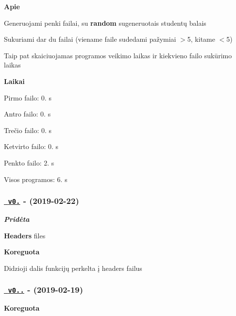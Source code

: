 {\bfseries{Apie}}


\begin{DoxyItemize}
\item Generuojami penki failai, su {\bfseries{random}} sugeneruotais studentų balais
\item Sukuriami dar du failai (viename faile sudedami pažymiai $>$5, kitame $<$5)
\item Taip pat skaiciuojamas programos veikimo laikas ir kiekvieno failo sukūrimo laikas
\end{DoxyItemize}

{\bfseries{Laikai}}


\begin{DoxyItemize}
\item Pirmo failo\+: 0. s
\item Antro failo\+: 0. s
\item Trečio failo\+: 0. s
\item Ketvirto failo\+: 0. s
\item Penkto failo\+: 2. s
\item Visos programos\+: 6. s
\end{DoxyItemize}

\subsubsection*{\href{https://github.com/ToNyHasK/VUObjektinisNO2/releases/tag/v0.3}{\texttt{ v0.}} -\/ (2019-\/02-\/22)}

{\itshape {\bfseries{Pridėta}}}


\begin{DoxyItemize}
\item {\bfseries{Headers}} files
\end{DoxyItemize}

{\bfseries{Koreguota}}


\begin{DoxyItemize}
\item Didzioji dalis funkcijų perkelta į headers failus
\end{DoxyItemize}

\subsubsection*{\href{https://github.com/ToNyHasK/VUObjektinisNO2/releases/tag/v0.2.2}{\texttt{ v0..}} -\/ (2019-\/02-\/19)}

{\bfseries{Koreguota}}


